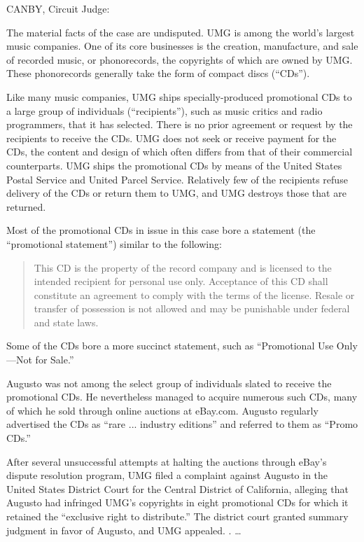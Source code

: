 
\textsc{CANBY}, Circuit Judge:

The material facts of the case are undisputed. UMG is among the world's largest
music companies. One of its core businesses is the creation, manufacture, and
sale of recorded music, or phonorecords, the copyrights of which are owned by
UMG. These phonorecords generally take the form of compact discs (``CDs'').

Like many music companies, UMG ships specially-produced promotional CDs to a
large group of individuals (``recipients''), such as music critics and radio
programmers, that it has selected. There is no prior agreement or request by
the recipients to receive the CDs. UMG does not seek or receive payment for the
CDs, the content and design of which often differs from that of their
commercial counterparts. UMG ships the promotional CDs by means of the United
States Postal Service and United Parcel Service. Relatively few of the
recipients refuse delivery of the CDs or return them to UMG, and UMG destroys
those that are returned.

Most of the promotional CDs in issue in this case bore a statement (the
``promotional statement'') similar to the following:

\begin{quote}
This CD is the property of the record company and is licensed to the intended
recipient for personal use only. Acceptance of this CD shall constitute an
agreement to comply with the terms of the license. Resale or transfer of
possession is not allowed and may be punishable under federal and state laws.
\end{quote}

Some of the CDs bore a more succinct statement, such as ``Promotional Use
Only---Not for Sale.''

Augusto was not among the select group of individuals slated to receive the
promotional CDs. He nevertheless managed to acquire numerous such CDs, many of
which he sold through online auctions at eBay.com. Augusto regularly advertised
the CDs as ``rare ... industry editions'' and referred to them as ``Promo
CDs.''

After several unsuccessful attempts at halting the auctions through eBay's
dispute resolution program, UMG filed a complaint against Augusto in the United
States District Court for the Central District of California, alleging that
Augusto had infringed UMG's copyrights in eight promotional CDs for which it
retained the ``exclusive right to distribute.'' The district court granted
summary judgment in favor of Augusto, and UMG appealed. . {\dots}

